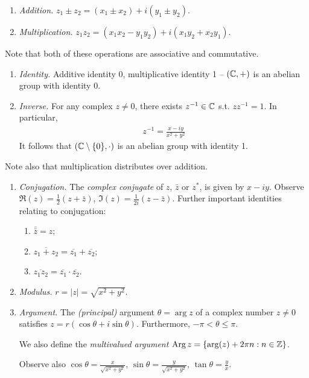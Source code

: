 \documentclass{../template/note}
\begin{document}
    \begin{enumerate}[label=\protect\circled{\arabic*}]
        \item \emph{Addition.} \(z_1 \pm z_2 = (x_1 \pm x_2) + i(y_1 \pm y_2)\).
        \item \emph{Multiplication.} \(z_1z_2 = (x_1x_2-y_1y_2)+i(x_1y_2+x_2y_1)\).
    \end{enumerate}
    Note that both of these operations are associative and commutative.
    \begin{enumerate}[label=\protect\circled{\arabic*},resume]
        \item \emph{Identity.} Additive identity 0, multiplicative identity 1 -- \((\mathbb C, +)\) is an abelian group with identity 0.
        \item \emph{Inverse.} For any complex \(z \neq 0\), there exists \(z^{-1} \in \mathbb C\) s.t. \(zz^{-1} = 1\). In particular,
        \begin{align*}
            z^{-1} = \frac{x-iy}{x^2+y^2}
        \end{align*}
        It follows that \((\mathbb C \setminus \{0\}, \cdot)\) is an abelian group with identity 1.
    \end{enumerate}
    Note also that multiplication distributes over addition.
    \begin{enumerate}[label=\protect\circled{\arabic*},resume]
        \item \emph{Conjugation.} The \emph{complex conjugate} of \(z\), \(\bar z\) or \(z^*\), is given by \(x-iy\). Observe \(\Re(z) = \frac{1}{2}(z+\bar z)\), \(\Im(z) = \frac{1}{2i}(z-\bar z)\). Further important identities relating to conjugation:
        \begin{enumerate}
            \item \(\bar{\bar z} = z\);
            \item \(\overline{z_1 + z_2} = \overline{z_1} + \overline{z_2}\);
            \item \(\overline{z_1z_2} = \overline{z_1}\cdot\overline{z_2}\).
        \end{enumerate}
        
        \item \emph{Modulus.} \(r = |z| = \sqrt{x^2+y^2}\).
        
        \item \emph{Argument.} The \emph{(principal)} argument \(\theta = \arg z\) of a complex number \(z \neq 0\) satisfies \(z = r(\cos \theta + i \sin \theta)\). Furthermore, \(-\pi < \theta \leq \pi\).
        
        We also define the \emph{multivalued argument} \(\operatorname{Arg} z = \{\arg(z) + 2\pi n : n \in \mathbb Z\}\).
        
        Observe also \(\cos \theta = \frac{x}{\sqrt{x^2+y^2}}\), \(\sin \theta = \frac{y}{\sqrt{x^2+y^2}}\), \(\tan \theta = \frac y x\).

    \end{enumerate}
\end{document}
